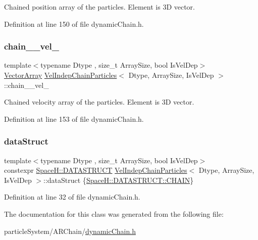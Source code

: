 Chained position array of the particles. Element is 3D vector. 



Definition at line 150 of file dynamic\+Chain.\+h.

\mbox{\label{class_vel_indep_chain_particles_a96ed0f2a5fcfb290dfafb42f08131e2f}} 
\subsubsection{\texorpdfstring{chain_\+\_\+vel\+\_\+}{chain_\_vel\_}}
{\footnotesize\ttfamily template$<$typename Dtype , size\+\_\+t Array\+Size, bool Is\+Vel\+Dep$>$ \\
\mbox{\hyperlink{class_vel_indep_particles_a27580f65b6523bfb6900520af2e44708}{Vector\+Array}} \mbox{\hyperlink{class_vel_indep_chain_particles}{Vel\+Indep\+Chain\+Particles}}$<$ Dtype, Array\+Size, Is\+Vel\+Dep $>$\+::chain_\+\_\+vel\+\_\+\hspace{0.3cm}{\ttfamily [protected]}}



Chained velocity array of the particles. Element is 3D vector. 



Definition at line 153 of file dynamic\+Chain.\+h.

\mbox{\label{class_vel_indep_chain_particles_a58396033a881431db18207bf280892ea}} 
\subsubsection{\texorpdfstring{data\+Struct}{dataStruct}}
{\footnotesize\ttfamily template$<$typename Dtype , size\+\_\+t Array\+Size, bool Is\+Vel\+Dep$>$ \\
constexpr \mbox{\hyperlink{namespace_space_h_a4782f089179a3c269891f02482b072df}{Space\+H\+::\+D\+A\+T\+A\+S\+T\+R\+U\+CT}} \mbox{\hyperlink{class_vel_indep_chain_particles}{Vel\+Indep\+Chain\+Particles}}$<$ Dtype, Array\+Size, Is\+Vel\+Dep $>$\+::data\+Struct \{\mbox{\hyperlink{namespace_space_h_a0af19f79a6498e99dbda772053d44a72a014d2cf3cdc3af6f4f92c09190860e33}{Space\+H\+::\+D\+A\+T\+A\+S\+T\+R\+U\+C\+T\+::\+C\+H\+A\+IN}}\}\hspace{0.3cm}{\ttfamily [static]}}



Definition at line 32 of file dynamic\+Chain.\+h.



The documentation for this class was generated from the following file\+:\begin{DoxyCompactItemize}
\item 
particle\+System/\+A\+R\+Chain/\mbox{\hyperlink{dynamic_chain_8h}{dynamic\+Chain.\+h}}\end{DoxyCompactItemize}
